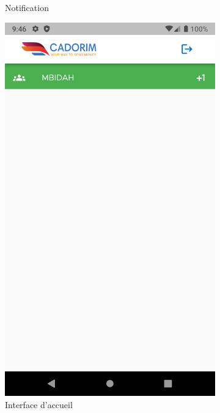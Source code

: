 \begin{itemize}[label=$\ast$]
\begin{figure}
\begin{subfigure}{0.3\textwidth}
	\caption{Notification}
	\label{klk}
\end{subfigure}
\begin{subfigure}{0.3\textwidth}
	\includegraphics[width=\hsize, valign=m ]{./Template LaTeX/Images/From_emu/no_vue.png}
	\caption{Interface d’accueil}
	\label{klk}
\end{subfigure}
\begin{subfigure}{0.3\textwidth}

\end{subfigure}
\end{figure}
\end{itemize}
